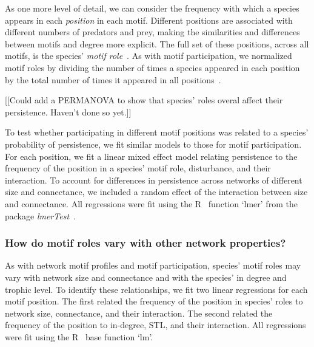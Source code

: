 \documentclass[12pt]{article}
\begin{document}
\begin{spacing}{2.0}
            As one more level of detail, we can consider the frequency with which a species appears in each \emph{position} in each motif. 
            Different positions are associated with different numbers of predators and prey, making the similarities and differences between motifs and degree more explicit.
            The full set of these positions, across all motifs, is the species' \emph{motif role}~\citep{Stouffer2010,Cirtwill2017}.
            As with motif participation, we normalized motif roles by dividing the number of times a species appeared in each position by the total number of times it appeared in all positions~\citep{Baker2015,Cirtwill2017}.
            
            
            [[Could add a PERMANOVA to show that species' roles overal affect their persistence. Haven't done so yet.]]
            

            To test whether participating in different motif positions was related to a species' probability of persistence, we fit similar models to those for motif participation.
            For each position, we fit a linear mixed effect model relating persistence to the frequency of the position in a species' motif role, disturbance, and their interaction.
            To account for differences in persistence across networks of different size and connectance, we included a random effect of the interaction between size and connectance.
            All regressions were fit using the R~\citep{R} function `lmer' from the package \emph{lmerTest}~\citep{lmerTest}.


        \subsubsection*{How do motif roles vary with other network properties?}
        
            As with network motif profiles and motif participation, species' motif roles may vary with network size and connectance and with the species' in degree and trophic level.
            To identify these relationships, we fit two linear regressions for each motif position.
            The first related the frequency of the position in species' roles to network size, connectance, and their interaction.
            The second related the frequency of the position to in-degree, STL, and their interaction.
            All regressions were fit using the R~\citep{R} base function `lm'.
            
            


\end{spacing}
\end{document}
